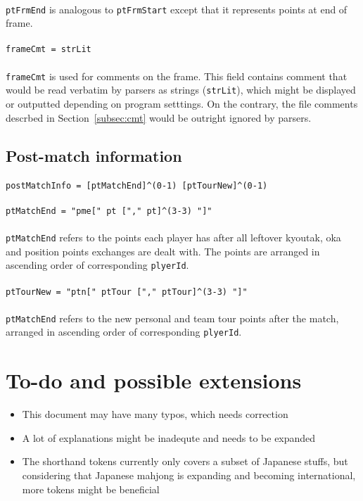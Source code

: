 \documentclass[%
	a4paper%
	,10pt%
	,twoside%
	,notitlepage%
]{article}%
\newcommand*{\ruleSymbol}{\textjapanese{⚠}}%
\newcommand*{\ruleMargin}{\marginpar{\flushright{}\ruleSymbol{}}}%
\newcommand*{\rulePar}{\paragraph*{\ruleMargin{}}}%
\begin{document}
			\paragraph*{}\lstinline/ptFrmEnd/ is analogous to \lstinline/ptFrmStart/ except that it represents points at end of frame. %
			\rulePar{}\lstinline/frameCmt = strLit/%
			\paragraph*{}\lstinline/frameCmt/ is used for comments on the frame. This field contains comment that would be read verbatim by parsers as strings (\lstinline/strLit/), which might be displayed or outputted depending on program setttings. On the contrary, the file comments descrbed in Section~\ref{subsec:cmt} would be outright ignored by parsers. %
	\subsection{Post-match information}%
		\rulePar{}\lstinline/postMatchInfo = [ptMatchEnd]^(0-1) [ptTourNew]^(0-1)/%
		\rulePar{}\lstinline/ptMatchEnd = "pme[" pt ["," pt]^(3-3) "]"/%
		\paragraph*{}\lstinline/ptMatchEnd/ refers to the points each player has after all leftover kyoutak, oka and position points exchanges are dealt with. The points are arranged in ascending order of corresponding \lstinline/plyerId/. %
		\rulePar{}\lstinline/ptTourNew = "ptn[" ptTour ["," ptTour]^(3-3) "]"/%
		\paragraph*{}\lstinline/ptMatchEnd/ refers to the new personal and team tour points after the match, arranged in ascending order of corresponding \lstinline/plyerId/. %
\section{To-do and possible extensions}%
% 
	\begin{itemize}%
		\item{}This document may have many typos, which needs correction%
		\item{}A lot of explanations might be inadequte and needs to be expanded%
		\item{}The shorthand tokens currently only covers a subset of Japanese stuffs, but considering that Japanese mahjong is expanding and becoming international, more tokens might be beneficial%
	\end{itemize}%
% 
\appendix{}%
\clearpage{}%
\lstset{%
	deleteindex=[1][keywords]%
}%
\end{document}
